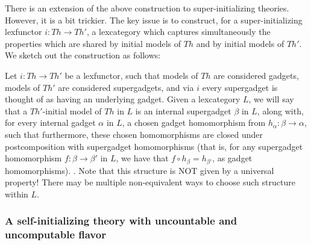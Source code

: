 There is an extension of the above construction to super-initializing theories. However, it is a bit trickier. The key issue is to construct, for a super-initializing lexfunctor $i : Th \to Th'$, a lexcategory which captures simultaneously the properties which are shared by initial models of $Th$ and by initial models of $Th'$. We sketch out the construction as follows:

\begin{construction}
Let $i : Th \to Th'$ be a lexfunctor, such that models of $Th$ are considered gadgets, models of $Th'$ are considered supergadgets, and via $i$ every supergadget is thought of as having an underlying gadget. Given a lexcategory $L$, we will say that a $Th'$-initial model of $Th$ in $L$ is an internal supergadget $\beta$ in $L$, along with, for every internal gadget $\alpha$ in $L$, a chosen gadget homomorphism from $h_\alpha : \beta \to \alpha$, such that furthermore, these chosen homomorphisms are closed under postcomposition with supergadget homomorphisms (that is, for any supergadget homomorphism $f : \beta \to \beta'$ in $L$, we have that $f \circ h_{\beta} = h_{\beta'}$, as gadget homomorphisms). . Note that this structure is NOT given by a universal property! There may be multiple non-equivalent ways to choose such structure within $L$. \TODO {}
\end{construction}

\subsubsection{A self-initializing theory with uncountable and uncomputable flavor}


